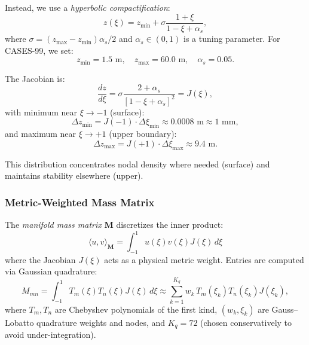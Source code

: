 \documentclass[11pt,a4paper]{article}
\begin{document}
Instead, we use a \emph{hyperbolic compactification}:
\begin{equation}
z(\xi) = z_{\min} + \sigma \frac{1 + \xi}{1 - \xi + \alpha_s},
\label{eq:hyperbolic}
\end{equation}
where $\sigma = (z_{\max} - z_{\min}) \alpha_s / 2$ and $\alpha_s \in (0, 1)$ is a tuning parameter. For CASES-99, we set:
\begin{equation}
z_{\min} = 1.5 \text{ m}, \quad z_{\max} = 60.0 \text{ m}, \quad \alpha_s = 0.05.
\end{equation}

The Jacobian is:
\begin{equation}
\frac{dz}{d\xi} = \sigma \frac{2 + \alpha_s}{[1 - \xi + \alpha_s]^2} = J(\xi),
\label{eq:jacobian}
\end{equation}
with minimum near $\xi \to -1$ (surface):
\begin{equation}
\Delta z_{\min} = J(-1) \cdot \Delta \xi_{\min} \approx 0.0008 \text{ m} \approx 1 \text{ mm},
\end{equation}
and maximum near $\xi \to +1$ (upper boundary):
\begin{equation}
\Delta z_{\max} = J(+1) \cdot \Delta \xi_{\max} \approx 9.4 \text{ m}.
\end{equation}

This distribution concentrates nodal density where needed (surface) and maintains stability elsewhere (upper).

\subsubsection{Metric-Weighted Mass Matrix}

The \emph{manifold mass matrix} $\mathbf{M}$ discretizes the inner product:
\begin{equation}
\langle u, v \rangle_{\mathbf{M}} = \int_{-1}^{1} u(\xi) v(\xi) J(\xi) \, d\xi
\label{eq:metric_inner_product}
\end{equation}
where the Jacobian $J(\xi)$ acts as a physical metric weight. Entries are computed via Gaussian quadrature:
\begin{equation}
M_{mn} = \int_{-1}^{1} T_m(\xi) T_n(\xi) J(\xi) \, d\xi \approx \sum_{k=1}^{K_q} w_k \, T_m(\xi_k) T_n(\xi_k) J(\xi_k),
\label{eq:mass_matrix}
\end{equation}
where $T_m, T_n$ are Chebyshev polynomials of the first kind, $(w_k, \xi_k)$ are Gauss--Lobatto quadrature weights and nodes, and $K_q = 72$ (chosen conservatively to avoid under-integration).
\end{document}
